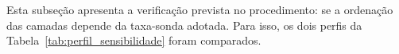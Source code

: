 Esta subseção apresenta a verificação prevista no procedimento:
se a ordenação das camadas depende da taxa-sonda
adotada. Para isso, os dois perfis da Tabela~\ref{tab:perfil_sensibilidade} foram comparados.

